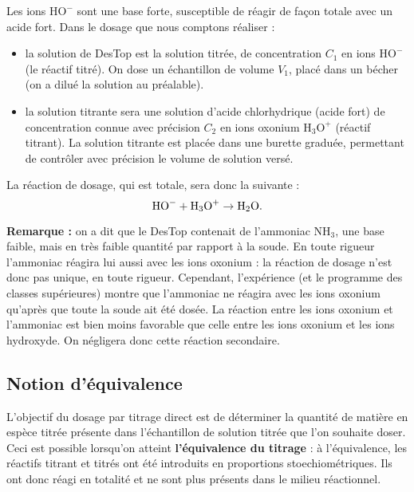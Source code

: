 \documentclass[11pt,a4paper]{report}
\begin{document}
Les ions $\text{HO}^-$ sont une base forte, susceptible de réagir de façon totale avec un acide fort. Dans le dosage que nous comptons réaliser :
\begin{itemize}
	\item la solution de DesTop est la solution titrée, de concentration $C_1$ en ions $\text{HO}^-$ (le réactif titré). On dose un échantillon de volume $V_1$, placé dans un bécher (on a dilué la solution au préalable).
	\item la solution titrante sera une solution d'acide chlorhydrique (acide fort) de concentration connue avec précision $C_2$ en ions oxonium $\text{H}_3\text{O}^+$ (réactif titrant). La solution titrante est placée dans une burette graduée, permettant de contrôler avec précision le volume de solution versé.
\end{itemize}

La réaction de dosage, qui est totale, sera donc la suivante :
\begin{equation}
	\text{HO}^- + \text{H}_3\text{O}^+ \rightarrow \text{H}_2\text{O}.\\
\end{equation}

\textbf{Remarque :} on a dit que le DesTop contenait de l'ammoniac $\text{NH}_3$, une base faible, mais en très faible quantité par rapport à la soude. En toute rigueur l'ammoniac réagira lui aussi avec les ions oxonium : la réaction de dosage n'est donc pas unique, en toute rigueur. Cependant, l'expérience (et le programme des classes supérieures) montre que l'ammoniac ne réagira avec les ions oxonium qu'après que toute la soude ait été dosée. La réaction entre les ions oxonium et l'ammoniac est bien moins favorable que celle entre les ions oxonium et les ions hydroxyde. On négligera donc cette réaction secondaire.

\subsection{Notion d'équivalence}

L'objectif du dosage par titrage direct est de déterminer la quantité de matière en espèce titrée présente dans l'échantillon de solution titrée que l'on souhaite doser. Ceci est possible lorsqu'on atteint \textbf{l'équivalence du titrage} : à l'équivalence, les réactifs titrant et titrés ont été introduits en proportions stoechiométriques. Ils ont donc réagi en totalité et ne sont plus présents dans le milieu réactionnel.\\
\end{document}
